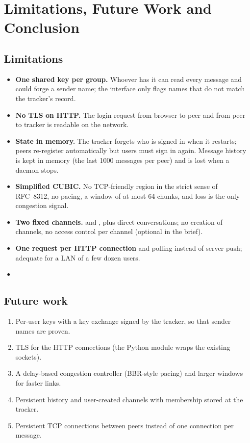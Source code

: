 \section{Limitations, Future Work and Conclusion}\label{sec:conclusion}

\subsection{Limitations}
\begin{itemize}
  \item \textbf{One shared key per group.} Whoever has it can read every message and could forge a
        sender name; the interface only flags names that do not match the tracker's record.
  \item \textbf{No TLS on HTTP.} The login request from browser to peer and from peer to tracker is
        readable on the network.
  \item \textbf{State in memory.} The tracker forgets who is signed in when it restarts; peers
        re-register automatically but users must sign in again. Message history is kept in memory
        (the last 1000 messages per peer) and is lost when a daemon stops.
  \item \textbf{Simplified CUBIC.} No TCP-friendly region in the strict sense of RFC~8312, no pacing,
        a window of at most 64 chunks, and loss is the only congestion signal.
  \item \textbf{Two fixed channels.}  and , plus direct conversations;
        no creation of channels, no access control per channel (optional in the brief).
  \item \textbf{One request per HTTP connection} and polling instead of server push; adequate for a
        LAN of a few dozen users.
  \item {}
\end{itemize}

\subsection{Future work}
\begin{enumerate}
  \item Per-user keys with a key exchange signed by the tracker, so that sender names are proven.
  \item TLS for the HTTP connections (the Python  module wraps the existing sockets).
  \item A delay-based congestion controller (BBR-style pacing) and larger windows for faster links.
  \item Persistent history and user-created channels with membership stored at the tracker.
  \item Persistent TCP connections between peers instead of one connection per message.
\end{enumerate}

